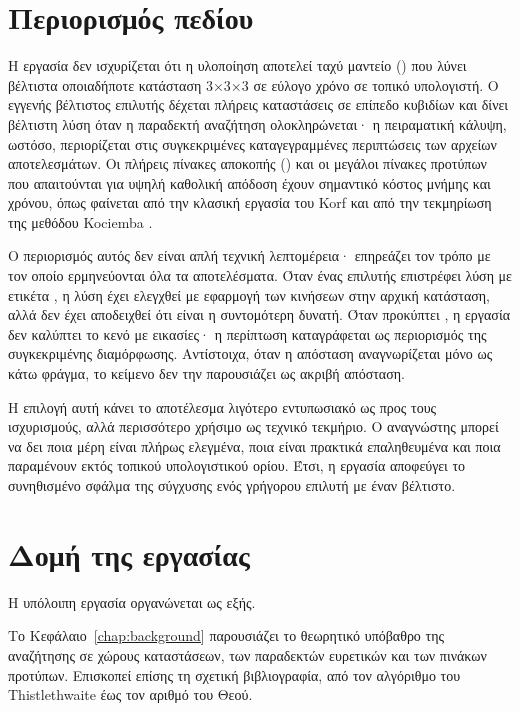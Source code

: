 \section{Περιορισμός πεδίου}\label{sec:intro-scope}
Η εργασία δεν ισχυρίζεται ότι η υλοποίηση αποτελεί ταχύ μαντείο () που λύνει βέλτιστα οποιαδήποτε κατάσταση 3×3×3 σε εύλογο χρόνο σε τοπικό υπολογιστή. Ο εγγενής βέλτιστος επιλυτής δέχεται πλήρεις καταστάσεις σε επίπεδο κυβιδίων και δίνει βέλτιστη λύση όταν η παραδεκτή αναζήτηση ολοκληρώνεται· η πειραματική κάλυψη, ωστόσο, περιορίζεται στις συγκεκριμένες καταγεγραμμένες περιπτώσεις των αρχείων αποτελεσμάτων. Οι πλήρεις πίνακες αποκοπής () και οι μεγάλοι πίνακες προτύπων που απαιτούνται για υψηλή καθολική απόδοση έχουν σημαντικό κόστος μνήμης και χρόνου, όπως φαίνεται από την κλασική εργασία του Korf \cite{korf1997pattern} και από την τεκμηρίωση της μεθόδου Kociemba \cite{kociembaImplementationDetails}.

Ο περιορισμός αυτός δεν είναι απλή τεχνική λεπτομέρεια· επηρεάζει τον τρόπο με τον οποίο ερμηνεύονται όλα τα αποτελέσματα. Όταν ένας επιλυτής επιστρέφει λύση με ετικέτα , η λύση έχει ελεγχθεί με εφαρμογή των κινήσεων στην αρχική κατάσταση, αλλά δεν έχει αποδειχθεί ότι είναι η συντομότερη δυνατή. Όταν προκύπτει , η εργασία δεν καλύπτει το κενό με εικασίες· η περίπτωση καταγράφεται ως περιορισμός της συγκεκριμένης διαμόρφωσης. Αντίστοιχα, όταν η απόσταση αναγνωρίζεται μόνο ως κάτω φράγμα, το κείμενο δεν την παρουσιάζει ως ακριβή απόσταση.

Η επιλογή αυτή κάνει το αποτέλεσμα λιγότερο εντυπωσιακό ως προς τους ισχυρισμούς, αλλά περισσότερο χρήσιμο ως τεχνικό τεκμήριο. Ο αναγνώστης μπορεί να δει ποια μέρη είναι πλήρως ελεγμένα, ποια είναι πρακτικά επαληθευμένα και ποια παραμένουν εκτός τοπικού υπολογιστικού ορίου. Έτσι, η εργασία αποφεύγει το συνηθισμένο σφάλμα της σύγχυσης ενός γρήγορου επιλυτή με έναν βέλτιστο.

\section{Δομή της εργασίας}\label{sec:intro-structure}
Η υπόλοιπη εργασία οργανώνεται ως εξής.

Το Κεφάλαιο~\ref{chap:background} παρουσιάζει το θεωρητικό υπόβαθρο της αναζήτησης σε χώρους καταστάσεων, των παραδεκτών ευρετικών και των πινάκων προτύπων. Επισκοπεί επίσης τη σχετική βιβλιογραφία, από τον αλγόριθμο του Thistlethwaite έως τον αριθμό του Θεού.

